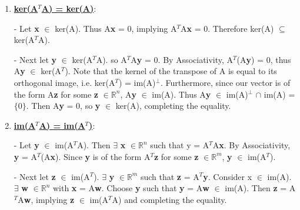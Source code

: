 \documentclass[12pt]{article}
\newcommand{\hop}{\vspace{1mm}}
\newcommand{\jump}{\vspace{5mm}}
\newcommand{\R}{\mathbb{R}}
\begin{document}
\begin{enumerate}[leftmargin=\labelsep]
\begin{enumerate}
\begin{enumerate}
    \item \textbf{\underline{ker(A$^{T}$A) = ker(A)}}:
    \hop
    
    - Let \textbf{x} $\in$ ker(A). Thus A\textbf{x} = 0, implying A$^T$A\textbf{x} = 0. Therefore ker(A) $ \subseteq$ ker(A$^T$A).

    \hop
    - Next let \textbf{y} $\in$ ker(A$^T$A). so A$^T$A\textbf{y} = 0. By Associativity, A$^T$(A\textbf{y}) = 0, thus A\textbf{y} $\in$ ker(A$^T$). Note that the kernel of the transpose of A is equal to its orthogonal image, i.e. ker(A$^T$) = im(A)$^\perp$. Furthermore, since our vector is of the form A\textbf{z} for some \textbf{z} $\in \R^n$, A\textbf{y} $\in$ im(A). Thus A\textbf{y} $\in$ im(A)$^\perp$ $\cap$ im(A) = $\{0\}$.
    Then A\textbf{y} = 0, so \textbf{y} $\in$ ker(A), completing the equality. 

    \jump
    \item \textbf{\underline{im(A$^{T}$A) = im(A$^T$)}}:
    \hop
    
    - Let \textbf{y} $\in$ im(A$^T$A). Then $\exists$ \textbf{x} $\in \R^n$ such that y = A$^T$A\textbf{x}. By Associativity, \textbf{y} = A$^T$(A\textbf{x}). Since \textbf{y} is of the form A$^T$\textbf{z} for some \textbf{z} $\in \R^m$, \textbf{y} $\in$ im(A$^T$).
    
    \hop
    - Next let \textbf{z} $\in$ im(A$^T$). $\exists$ \textbf{y} $\in \R^m$ such that \textbf{z} = A$^T$\textbf{y}. Consider x $\in$ im(A). $\exists$ \textbf{w} $\in \R^n$ with \textbf{x} = A\textbf{w}. Choose \textbf{y} such that \textbf{y} = A\textbf{w} $\in$ im(A). Then \textbf{z} = A$^T$A\textbf{w}, implying \textbf{z} $\in$ im(A$^T$A) and completing the equality.  
\end{enumerate}


\end{enumerate}
\end{enumerate}
\end{document}

